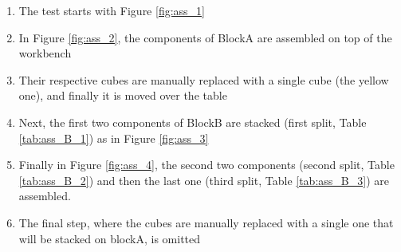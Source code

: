 \begin{enumerate}
	\item The test starts with Figure \ref{fig:ass_1}
	\item In Figure \ref{fig:ass_2}, the components of BlockA are assembled on top of the workbench 
	\item Their respective cubes are manually replaced with a single cube (the yellow one), and finally it is moved over the table
	\item Next, the first two components of BlockB are stacked (first split, Table \ref{tab:ass_B_1}) as in Figure \ref{fig:ass_3}
	\item Finally in Figure \ref{fig:ass_4}, the second two components (second split, Table \ref{tab:ass_B_2}) and then the last one (third split, Table \ref{tab:ass_B_3}) are assembled. 
	\item The final step, where the cubes are manually replaced with a single one that will be stacked on blockA, is omitted
\end{enumerate}
	
